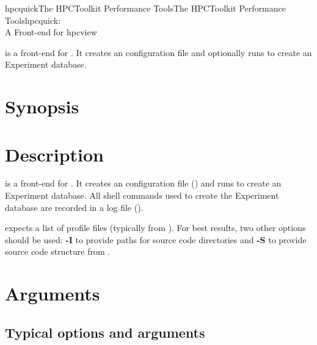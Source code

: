 \documentclass[english]{article}
\begin{document}
\begin{Name}{1}{hpcquick}{The HPCToolkit Performance Tools}{The HPCToolkit Performance Tools}{hpcquick:\\ A Front-end for hpcview}

 is a front-end for .
It creates an  configuration file and optionally runs  to create an Experiment database.

\end{Name}

\section{Synopsis}

 

\section{Description}

 is a front-end for .
It creates an  configuration file () and runs  to create an Experiment database.
All shell commands used to create the Experiment database are recorded in a log file ().

 expects a list of profile files (typically from ).
For best results, two other options should be used: \textbf{-I} to provide paths for source code directories and \textbf{-S} to provide source code structure from .


\section{Arguments}

\subsection{Typical options and arguments}
\end{document}
